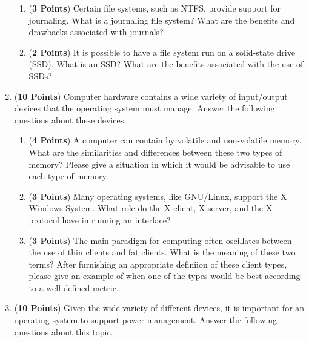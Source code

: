 \documentclass[12pt,epsf,psfig,graphics]{article}
\begin{document}
\begin{enumerate}
\begin{enumerate}
  \item ({\bf 3 Points}) Certain file systems, such as NTFS, provide support for journaling.  What is a
    journaling file system?  What are the benefits and drawbacks associated with journals?

  \item ({\bf 2 Points}) It is possible to have a file system run on a solid-state drive (SSD).  What is an SSD?  What
    are the benefits associated with the use of SSDs? 

\end{enumerate}

\newpage

\item ({\bf 10 Points}) Computer hardware contains a wide variety of input/output devices that the operating system must
  manage.  Answer the following questions about these devices.

  \begin{enumerate}

    \item ({\bf 4 Points}) A computer can contain by volatile and non-volatile memory.  What are the similarities and
      differences between these two types of memory?  Please give a situation in which it would be advisable to use each
      type of memory.

    \item ({\bf 3 Points}) Many operating systems, like GNU/Linux, support the X Windows System.  What role do the X
      client, X server, and the X protocol have in running an interface?

    \item ({\bf 3 Points}) The main paradigm for computing often oscillates between the use of thin clients and fat
      clients.  What is the meaning of these two terms?  After furnishing an appropriate definiion of these client
      types, please give an example of when one of the types would be best according to a well-defined metric.

  \end{enumerate}

  \newpage

\item ({\bf 10 Points}) Given the wide variety of different devices, it is important for an operating system to support
  power management.  Answer the following questions about this topic.

  \begin{enumerate}


\end{enumerate}
\end{enumerate}
\end{document}
